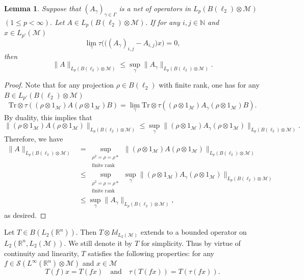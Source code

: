 \documentclass[oneside,english,a4wide]{amsart}
\numberwithin{equation}{section}
\numberwithin{figure}{section}
\theoremstyle{plain}
\theoremstyle{plain}
\theoremstyle{definition}
\theoremstyle{plain}
\newtheorem{lemma}[thm]{Lemma}
\theoremstyle{remark}
\theoremstyle{definition}
\theoremstyle{remark}
\theoremstyle{definition}
\newcommand{\M}{{\mathcal M}}
\newcommand{\8}{\infty}
\begin{document}
\begin{lemma}\label{lem5.1.9AAA}
	Suppose that $(A_\gamma)_{\gamma\in \Gamma}$ is a net of operators in $L_p(B(\ell_2)\otimes \mathcal{M})$ $(1\leq p<\8)$. Let $A\in L_p(B(\ell_2)\otimes \mathcal{M})$. If for any $i, j\in \mathbb{N}$ and $x\in L_{p'}(\M)$
	$$ \lim_{\gamma} \tau\bigg( \big((A_\gamma)_{i, j}-A_{i, j}\big) x\bigg)=0,  $$
	then
	$$ \|A\|_{L_p(B(\ell_2)\otimes \mathcal{M})} \leq \sup_{\gamma}  \|A_\gamma\|_{L_p(B(\ell_2)\otimes \mathcal{M})}. $$
\end{lemma}
\begin{proof}
	Note that for any projection $\rho\in B(\ell_2)$ with finite rank, one has for any $B\in L_{p'}(B(\ell_2)\otimes \mathcal{M})$
	$$  \text{Tr}\otimes \tau ((\rho\otimes 1_{\M})A(\rho\otimes 1_{\M}) B) =\lim_\gamma  \text{Tr}\otimes \tau ((\rho\otimes 1_{\M})A_\gamma(\rho\otimes 1_{\M})B).  $$
	By duality, this implies that
	$$  \|(\rho\otimes 1_{\M})A(\rho\otimes 1_{\M})\|_{L_p(B(\ell_2)\otimes \mathcal{M})} \leq \sup_\gamma  \|(\rho\otimes 1_{\M})A_\gamma(\rho\otimes 1_{\M})\|_{L_p(B(\ell_2)\otimes \mathcal{M})}.   $$
	Therefore, we have
	\begin{equation*}
		\begin{aligned}
			\|A\|_{L_p(B(\ell_2)\otimes \mathcal{M})}&=\sup_{\substack{\rho^2=\rho=\rho* \\ \text{finite rank}}}\|(\rho\otimes 1_{\M})A(\rho\otimes 1_{\M})\|_{L_p(B(\ell_2)\otimes \mathcal{M})} \\
			&\leq \sup_{\substack{\rho^2=\rho=\rho* \\ \text{finite rank}}}\sup_\gamma  \|(\rho\otimes 1_{\M})A_\gamma(\rho\otimes 1_{\M})\|_{L_p(B(\ell_2)\otimes \mathcal{M})}\\
			&\leq \sup_{\gamma}  \|A_\gamma\|_{L_p(B(\ell_2)\otimes \mathcal{M})},
		\end{aligned}
	\end{equation*}
	as desired.
\end{proof}

Let $T\in B(L_2(\mathbb{R}^n))$. Then $T\otimes Id_{L_2(\M)}$ extends to a bounded operator on $L_2(\mathbb{R}^n, L_2(\M))$. We still denote it by $T$ for simplicity. Thus by virtue of continuity and linearity, $T$ satisfies the following properties: for any $f\in \mathcal{S}(L^\8(\mathbb{R}^n)\otimes\M)$ and $x\in \M$
\begin{equation}\label{Tid}
	T(f)x=T(fx) \quad \text{and} \quad \tau (T(fx))= T(\tau(fx)).
\end{equation}
\end{document}

